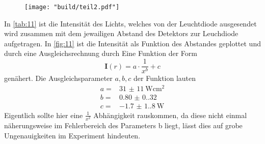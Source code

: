\begin{figure}[H]
    \caption{}
    \label{fig:11}
    \centering
    \texttt{[image: "build/teil2.pdf"]}
\end{figure}
In \autoref{tab:11} ist die Intensität des Lichts, welches von der Leuchtdiode ausgesendet wird 
zusammen mit dem jewailigen Abstand des Detektors zur Leuchdiode aufgetragen. In \autoref{fig:11}
ist die Intensität als Funktion des Abstandes geplottet und durch eine Ausgleichsrechnung 
durch Eine Funktion der Form 
\begin{equation}
    \symbf{I}\left(r\right) = a \cdot \frac{1}{x^b} + c
\end{equation}
genähert.
Die Ausgleichsparameter $a, b, c$ der Funktion lauten
\begin{align*}
    a = & \qty{31(11)}{\watt\centi\meter\squared}   \\
    b = & \qty{0.80(0.32)}{}     \\
    c = & \qty{-1.7(1.8)}{\watt}       
\end{align*}
Eigentlich sollte hier eine $\frac{1}{x^2}$ Abhängigkeit rauskommen, da diese nicht einmal 
näherungsweise im Fehlerbereich des Parameters b liegt, lässt dies auf grobe Ungenauigkeiten
im Experiment hindeuten.

\label{sec:Auswertung}
